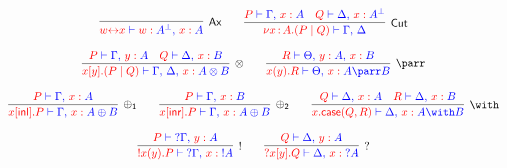 \begin{figure*}
\[\colored
\begin{array}{c}

\inference{
}{Ax}{
  \tm{w \link x} \tpvdash \tp{\tmof{w} \dualbt{A} \comma \tmof{x} A}
}

\quad\quad

\inference{
  \tm{P} \tpvdash \tp{\Gamma \comma \tmof{x}A}
  &
  \tm{Q} \tpvdash \tp{\Delta \comma \tmof{x}\dualbt{A}}
}{Cut}{
  \tm{\nu x \of{A}.(P \mid Q)} \tpvdash \tp{\Gamma \comma \Delta}
}

\\~\\

\inference{
  \tm{P} \tpvdash \tp{\Gamma \comma \tmof{y}A}  &
  \tm{Q} \tpvdash \tp{\Delta \comma \tmof{x}B}
}{\otimes}{
  \tm{x[y].(P \mid Q)} \tpvdash \tp{\Gamma \comma \Delta \comma \tmof{x}A
    \otimes B}
}

\quad\quad

\inference{
  \tm{R} \tpvdash \tp{\Theta \comma \tmof{y}A \comma \tmof{x}B}
}{\parr}{
  \tm{x(y).R} \tpvdash \tp{\Theta \comma \tmof{x}A \parr B}
}

\\~\\

\inference{
  \tm{P} \tpvdash \tp{\Gamma \comma \tmof{x}A}
}{\oplus_1}{
  \tm{x[\inlterm].P} \tpvdash \tp{\Gamma \comma \tmof{x}A \oplus B}
}

\quad\quad

\inference{
  \tm{P} \tpvdash \tp{\Gamma \comma \tmof{x}B}
}{\oplus_2}{
  \tm{x[\inrterm].P} \tpvdash \tp{\Gamma \comma \tmof{x}A \oplus B}
}

\quad\quad

\inference{
  \tm{Q} \tpvdash \tp{\Delta \comma \tmof{x}A}  &
  \tm{R} \tpvdash \tp{\Delta \comma \tmof{x}B}
}{\with}{
  \tm{x.\caseterm(Q,R)} \tpvdash \tp{\Delta \comma \tmof{x}A \with B}
}

\\~\\

\inference{
  \tm{P} \tpvdash \tp{{?\Gamma} \comma \tmof{y}A}
}{!}{
  \tm{!x(y).P} \tpvdash \tp{{?\Gamma} \comma \tmof{x}{!A}}
}

\quad\quad

\inference{
  \tm{Q} \tpvdash \tp{\Delta \comma \tmof{y}A}
}{?}{
  \tm{?x[y].Q} \tpvdash \tp{\Delta \comma \tmof{x}{?A}}
}

\\~\\


\end{array}\]
\end{figure*}
